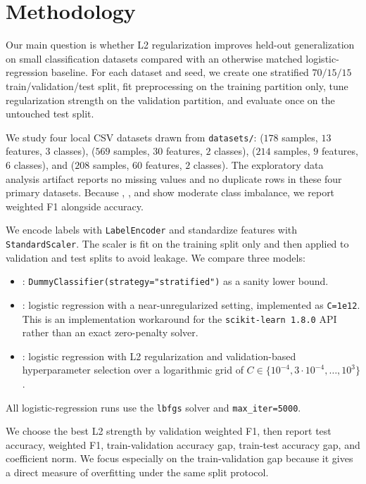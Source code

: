 \section{Methodology}
\label{sec:methodology}

 Our main question is whether L2 regularization improves held-out generalization on small classification datasets compared with an otherwise matched logistic-regression baseline. For each dataset and seed, we create one stratified $70/15/15$ train/validation/test split, fit preprocessing on the training partition only, tune regularization strength on the validation partition, and evaluate once on the untouched test split.

 We study four local CSV datasets drawn from \texttt{datasets/}: \wine ($178$ samples, $13$ features, $3$ classes), \breastcancer ($569$ samples, $30$ features, $2$ classes), \glass ($214$ samples, $9$ features, $6$ classes), and \sonar ($208$ samples, $60$ features, $2$ classes). The exploratory data analysis artifact reports no missing values and no duplicate rows in these four primary datasets. Because \breastcancer, \glass, and \sonar show moderate class imbalance, we report weighted F1 alongside accuracy.

 We encode labels with \texttt{LabelEncoder} and standardize features with \texttt{StandardScaler}. The scaler is fit on the training split only and then applied to validation and test splits to avoid leakage. We compare three models:
\begin{itemize}[leftmargin=*,itemsep=0pt,topsep=2pt]
    \item \dummy: \texttt{DummyClassifier(strategy="stratified")} as a sanity lower bound.
    \item \baseline: logistic regression with a near-unregularized setting, implemented as \texttt{C=1e12}. This is an implementation workaround for the \texttt{scikit-learn 1.8.0} API rather than an exact zero-penalty solver.
    \item \ltwo: logistic regression with L2 regularization and validation-based hyperparameter selection over a logarithmic grid of $C \in \{10^{-4}, 3\cdot10^{-4}, \ldots, 10^3\}$.
\end{itemize}
All logistic-regression runs use the \texttt{lbfgs} solver and \texttt{max\_iter=5000}.

 We choose the best L2 strength by validation weighted F1, then report test accuracy, weighted F1, train-validation accuracy gap, train-test accuracy gap, and coefficient \normltwo norm. We focus especially on the train-validation gap because it gives a direct measure of overfitting under the same split protocol.

